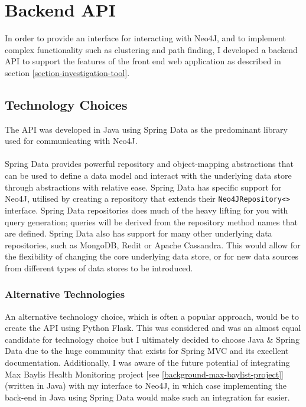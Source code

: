 \section{Backend API}\label{section-backend-api}
In order to provide an interface for interacting with Neo4J, and to implement complex functionality such as clustering and path finding, I developed a backend API to support the features of the front end web application as described in section \ref{section-investigation-tool}. 

\subsection{Technology Choices}
The API was developed in Java using Spring Data as the predominant library used for communicating with Neo4J. 
\\\\
Spring Data provides powerful repository and object-mapping abstractions that can be used to define a data model and interact with the underlying data store through abstractions with relative ease. Spring Data has specific support for Neo4J, utilised by creating a repository that extends their \texttt{Neo4JRepository<>} interface. Spring Data repositories does much of the heavy lifting for you with query generation; queries will be derived from the repository method names that are defined. Spring Data also has support for many other underlying data repositories, such as MongoDB, Redit or Apache Cassandra. This would allow for the flexibility of changing the core underlying data store, or for new data sources from different types of data stores to be introduced.

\subsubsection{Alternative Technologies}
An alternative technology choice, which is often a popular approach, would be to create the API using Python Flask. This was considered and was an almost equal candidate for technology choice but I ultimately decided to choose Java \& Spring Data due to the huge community that exists for Spring MVC and its excellent documentation. Additionally, I was aware of the future potential of integrating Max Baylis Health Monitoring project [see \ref{background-max-baylist-project}] (written in Java) with my interface to Neo4J, in which case implementing the back-end in Java using Spring Data would make such an integration far easier. 



